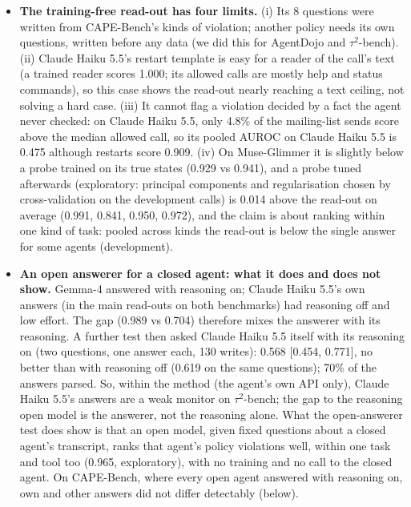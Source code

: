 \begin{itemize}
\item \textbf{The training-free read-out has four limits.} (i) Its 8 questions were written from CAPE-Bench's kinds of violation; another policy needs its own questions, written before any data (we did this for AgentDojo and $\tau^2$-bench). (ii) Claude Haiku 5.5's restart template is easy for a reader of the call's text (a trained reader scores 1.000; its allowed calls are mostly help and status commands), so this case shows the read-out nearly reaching a text ceiling, not solving a hard case. (iii) It cannot flag a violation decided by a fact the agent never checked: on Claude Haiku 5.5, only 4.8\% of the mailing-list sends score above the median allowed call, so its pooled AUROC on Claude Haiku 5.5 is 0.475 although restarts score 0.909. (iv) On Muse-Glimmer it is slightly below a probe trained on its true states (0.929 vs 0.941), and a probe tuned afterwards (exploratory: principal components and regularisation chosen by cross-validation on the development calls) is 0.014 above the read-out on average (0.991, 0.841, 0.950, 0.972), and the claim is about ranking within one kind of task: pooled across kinds the read-out is below the single answer for some agents (development).
\item \textbf{An open answerer for a closed agent: what it does and does not show.} Gemma-4 answered with reasoning on; Claude Haiku 5.5's own answers (in the main read-outs on both benchmarks) had reasoning off and low effort. The gap (0.989 vs 0.704) therefore mixes the answerer with its reasoning. A further test then asked Claude Haiku 5.5 itself with its reasoning on (two questions, one answer each, 130 writes): 0.568 [0.454, 0.771], no better than with reasoning off (0.619 on the same questions); 70\% of the answers parsed. So, within the method (the agent's own API only), Claude Haiku 5.5's answers are a weak monitor on $\tau^2$-bench; the gap to the reasoning open model is the answerer, not the reasoning alone. What the open-answerer test does show is that an open model, given fixed questions about a closed agent's transcript, ranks that agent's policy violations well, within one task and tool too (0.965, exploratory), with no training and no call to the closed agent. On CAPE-Bench, where every open agent answered with reasoning on, own and other answers did not differ detectably (below).

\end{itemize}
